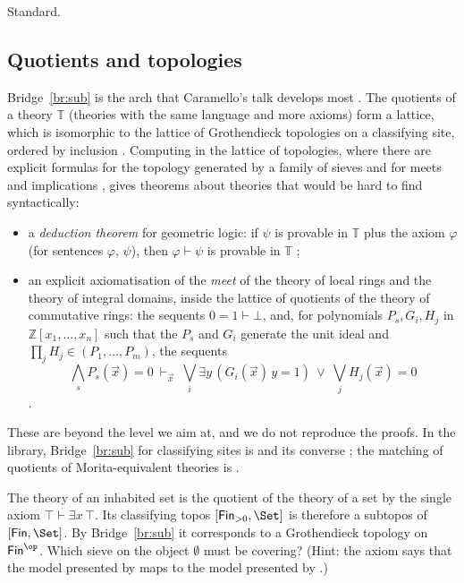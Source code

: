 \status{} Standard.

\subsection{Quotients and topologies}

Bridge~\ref{br:sub} is the arch that Caramello's talk develops most \cite[slides 38--54]{caramello-mines}. The quotients of a theory $\mathbb T$ (theories with the same language and more axioms) form a lattice, which is isomorphic to the lattice of Grothendieck topologies on a classifying site, ordered by inclusion \cite[ch.~3]{caramello-tst}. Computing in the lattice of topologies, where there are explicit formulas for the topology generated by a family of sieves and for meets and implications \cite[slides 50--51]{caramello-mines}, gives theorems about theories that would be hard to find syntactically:
\begin{itemize}
\item a \emph{deduction theorem} for geometric logic: if $\psi$ is provable in $\mathbb T$ plus the axiom $\varphi$ (for sentences $\varphi$, $\psi$), then $\varphi\vdash\psi$ is provable in $\mathbb T$ \cite[slide 52]{caramello-mines};
\item an explicit axiomatisation of the \emph{meet} of the theory of local rings and the theory of integral domains, inside the lattice of quotients of the theory of commutative rings: the sequents $0 = 1\vdash\bot$, and, for polynomials $P_s, G_i, H_j$ in $\mathbb Z[x_1,\dots,x_n]$ such that the $P_s$ and $G_i$ generate the unit ideal and $\prod_j H_j\in(P_1,\dots,P_m)$, the sequents
\[
\textstyle\bigwedge_s P_s(\vec x) = 0\ \vdash_{\vec x}\ \bigvee_i\exists y\,(G_i(\vec x)\,y = 1)\ \vee\ \bigvee_j H_j(\vec x) = 0
\]
\cite[\S18]{caramello-lattices}.
\end{itemize}
These are beyond the level we aim at, and we do not reproduce the proofs. In the library, Bridge~\ref{br:sub} for classifying sites is  and its converse ; the matching of quotients of Morita-equivalent theories is .

\begin{exercise}\label{exo:inhabited}
The theory of an inhabited set is the quotient of the theory of a set by the single axiom $\top\vdash\exists x\,\top$. Its classifying topos $[\mathsf{Fin}_{>0},\Set]$ is therefore a subtopos of $[\mathsf{Fin},\Set]$. By Bridge~\ref{br:sub} it corresponds to a Grothendieck topology on $\mathsf{Fin}^{\op}$. Which sieve on the object $\emptyset$ must be covering? (Hint: the axiom says that the model presented by  maps to the model presented by .)
\end{exercise}
